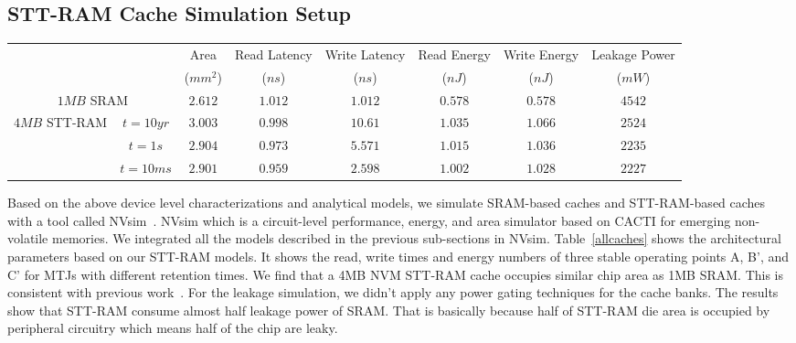 
\subsection{STT-RAM Cache Simulation Setup}

\begin{figure*} [t]
\centering
\centering
 \caption{\label{fig:currentVStime} Write current versus write pulse width for three MTJs with $10years$, $1sec$, and $10ms$ retention at $125\,^{\circ}\mathrm{C}$}
\end{figure*}

\begin{table*}[t]
 \scriptsize
  \centering
  \caption{16-way L2 Cache Simulation Results}
  \label{allcaches}
  \begin{tabular}{| c | c | c | c | c | c | c | c |}
    \hline\hline
    \multirow{2}{*}{} & & Area  & Read Latency & Write Latency & Read Energy & Write Energy & Leakage Power\\
  & & ($mm^2$) & ($ns$) & ($ns$) & ($nJ$) & ($nJ$) & ($mW$) \\
    \hline\hline
    \multicolumn{2}{|c|}{$1MB$ SRAM} & $2.612$ & $1.012$ & $1.012$ & $0.578$ & $0.578$ & $4542$ \\
    \hline
    \multirow{3}{*}{$4MB$ STT-RAM} & $t=10yr$ & $3.003$ & $0.998$ & $10.61$ & $1.035$ & $1.066$ & $2524$ \\
    & {$t=1s$} & $2.904$ & $0.973$ & $5.571$ & $1.015$ & $1.036$ & $2235$ \\
    & {$t=10ms$} & $2.901$ & $0.959$ & $2.598$ & $1.002$ & $1.028$ & $2227$ \\
    \hline\hline
  \end{tabular}
\end{table*}

Based on the above device level characterizations and analytical models, we simulate SRAM-based
caches and STT-RAM-based caches with a tool called NVsim~\cite{CACTI:PCRAMsim}. NVsim which is a
circuit-level performance, energy, and area simulator based on CACTI for emerging non-volatile
memories. We integrated all the models described in the previous sub-sections in NVsim.
Table~\ref{allcaches} shows the architectural parameters based on our STT-RAM models. It shows the
read, write times and energy numbers of three stable operating points A, B', and C' for MTJs with different retention times. We find that a 4MB NVM STT-RAM cache occupies similar chip area as 1MB SRAM. This is consistent with previous work~\cite{CACTI:DAC08:Dong}. For the leakage simulation, we didn't apply any power gating techniques for the cache banks. The results show that STT-RAM consume almost half leakage power of SRAM. That is basically because half of STT-RAM die area is occupied by peripheral circuitry which means half of the chip are leaky.

